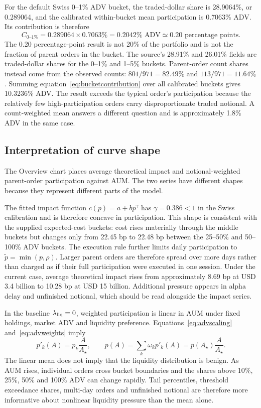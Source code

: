 \documentclass[11pt,a4paper]{article}
\numberwithin{equation}{section}
\begin{document}
For the default Swiss 0--1\% ADV bucket, the traded-dollar share is 28.9064\%, or 0.289064, and
the calibrated within-bucket mean participation is 0.7063\% ADV. Its contribution is therefore
\begin{equation}\label{eq:bucketcontributionexample}
 C_{0\text{--}1\%}=0.289064\times0.7063\%=0.2042\%\text{ ADV}
 \simeq 0.20\text{ percentage points}.
\end{equation}
The 0.20 percentage-point result is not 20\% of the portfolio and is not the fraction of parent
orders in the bucket. The source's 28.91\% and 26.01\% fields are traded-dollar shares for the
0--1\% and 1--5\% buckets. Parent-order count shares instead come from the observed counts:
$801/971=82.49\%$ and $113/971=11.64\%$. Summing equation~\eqref{eq:bucketcontribution}
over all calibrated buckets gives 10.3236\% ADV. The result exceeds the typical order's
participation because the relatively few high-participation orders carry disproportionate traded
notional. A count-weighted mean answers a different question and is approximately 1.8\% ADV in
the same case.

\subsection{Interpretation of curve shape}
The Overview chart places average theoretical impact and notional-weighted parent-order
participation against AUM. The two series have different shapes because they represent different
parts of the model.

The fitted impact function $c(p)=a+bp^\gamma$ has $\gamma=0.386<1$ in the Swiss calibration and is
therefore concave in participation. This shape is consistent with the supplied expected-cost
buckets: cost rises materially through the middle buckets but changes only from 22.45 bp to
22.48 bp between the 25--50\% and 50--100\% ADV buckets. The execution rule further limits daily
participation to $\widetilde p=\min(p,\rho)$. Larger parent orders are therefore spread over more
days rather than charged as if their full participation were executed in one session. Under the
current case, average theoretical impact rises from approximately 8.69 bp at USD 3.4 billion to
10.28 bp at USD 15 billion. Additional pressure appears in alpha delay and unfinished notional,
which should be read alongside the impact series.

In the baseline $\lambda_{\rm liq}=0$, weighted participation is linear in AUM under fixed holdings,
market ADV and liquidity preference. Equations~\eqref{eq:advscaling} and~\eqref{eq:advweights} imply
\begin{equation}\label{eq:linearparticipation}
 p'_k(A)=p_k\frac{A}{A_\star},\qquad
 \bar p(A)=\sum_k\omega_kp'_k(A)
 =\bar p(A_\star)\frac{A}{A_\star}.
\end{equation}
The linear mean does not imply that the liquidity distribution is benign. As AUM rises, individual
orders cross bucket boundaries and the shares above 10\%, 25\%, 50\% and 100\% ADV can change
rapidly. Tail percentiles, threshold exceedance shares, multi-day orders and unfinished notional
are therefore more informative about nonlinear liquidity pressure than the mean alone.
\end{document}
